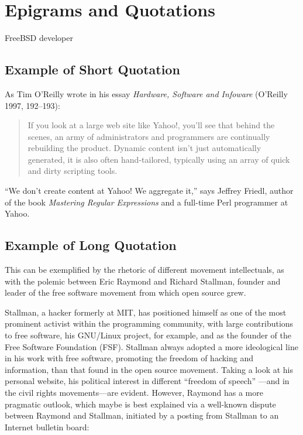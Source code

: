 \documentclass{mitpress}
\begin{document}
\chapter{Epigrams and Quotations}
\author{Author Name}

{FreeBSD developer}

\section{Example of Short Quotation}
As Tim O'Reilly wrote in his essay 
{\it Hardware, Software and Infoware} (O'Reilly
1997, 192--193):


\begin{quote} If you look at a large web site like Yahoo!, you'll see that
behind the scenes, an army of administrators and programmers are continually
rebuilding the product. Dynamic content isn't just automatically
generated, it is also often hand-tailored, typically using an array of quick
and dirty scripting tools.  
\end{quote}

``We don't create content at Yahoo! We
aggregate it,'' says Jeffrey Friedl, author of the book {\it
Mastering Regular
Expressions} and a full-time Perl programmer at Yahoo.  

\section{Example of Long Quotation}

This can be exemplified by the rhetoric of different movement
intellectuals, as with the polemic between Eric Raymond and Richard Stallman,
founder and leader of the free software movement from which open
source grew.

Stallman, a hacker formerly at MIT, has positioned himself as one of the
most prominent activist within the programming community, with large
contributions to free software, his GNU/Linux project, for example, and
as the founder of the Free Software Foundation (FSF). Stallman always
adopted a more ideological line in his work with free software, promoting
the freedom of hacking and information, than that found in the open
source movement. Taking a look at his personal website, his political interest
in different ``freedom of speech'' ---and in the civil rights movements---are 
evident. However, Raymond has a more pragmatic outlook, which
maybe is best explained via a well-known dispute between Raymond and
Stallman, initiated by a posting from Stallman to an Internet bulletin
board:
\end{document}
